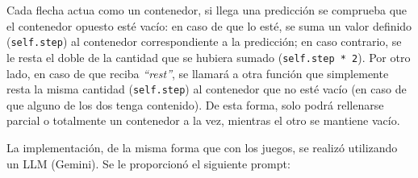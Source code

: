 Cada flecha actua como un contenedor, si llega una predicción se comprueba que el contenedor opuesto esté vacío: en caso de que lo esté, se suma un valor definido (\texttt{self.step}) al contenedor correspondiente a la predicción; en caso contrario, se le resta el doble de la cantidad que se hubiera sumado (\texttt{self.step * 2}). Por otro lado, en caso de que reciba \textit{``rest''}, se llamará a otra función que simplemente resta la misma cantidad (\texttt{self.step}) al contenedor que no esté vacío (en caso de que alguno de los dos tenga contenido). De esta forma, solo podrá rellenarse parcial o totalmente un contenedor a la vez, mientras el otro se mantiene vacío.

La implementación, de la misma forma que con los juegos, se realizó utilizando un LLM (Gemini). Se le proporcionó el siguiente prompt:

\begingroup %

\emergencystretch=0pt

